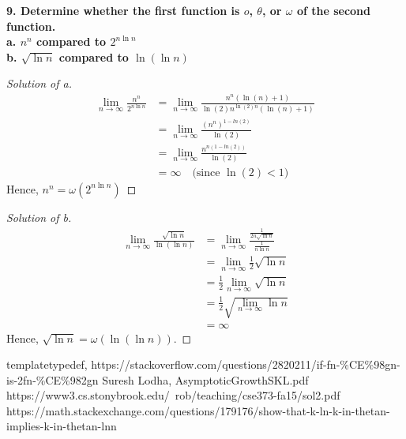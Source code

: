 \documentclass[12pt]{article}
\begin{document}
\noindent \textbf{9. Determine whether the first function is $o$, $\theta$, or $\omega$	of the second function.\\
	a. $n^n$ compared to $2^{n\ln n}$\\
	b. $\sqrt{\ln n}$ compared to $\ln(\ln n)$}
\begin{proof}[Solution of a]
	\begin{align*}
		\lim\limits_{n\to\infty}\frac{n^n}{2^{n\ln n}}&=\lim\limits_{n\to\infty}\frac{n^n(\ln (n)+1)}{\ln(2)n^{\ln(2)n}(\ln(n)+1)}\\
		&=\lim\limits_{n\to\infty}\frac{(n^n)^{1-ln(2)}}{\ln(2)}\\
		&=\lim\limits_{n\to\infty}\frac{n^{n(1-ln(2))}}{\ln(2)}\\
		&=\infty \quad\text{(since $\ln(2)<1$)}
	\end{align*}
	Hence, $n^n = \omega(2^{n\ln n})$
\end{proof}
\begin{proof}[Solution of b]
	\begin{align*}
		\lim\limits_{n\to\infty}\frac{\sqrt{\ln n}}{\ln(\ln n)}&=\lim\limits_{n\to\infty}\frac{\frac{1}{2n\sqrt{\ln n}}}{\frac{1}{n\ln n}}\\
		&=\lim\limits_{n\to\infty}\frac{1}{2}\sqrt{\ln n}\\
		&=\frac{1}{2}\lim\limits_{n\to\infty}\sqrt{\ln n}\\
		&=\frac{1}{2}\sqrt{\lim\limits_{n\to\infty}\ln n}\\
		&=\infty
	\end{align*}
	Hence, $\sqrt{\ln n} =\omega(\ln(\ln n))$.
\end{proof}

\bigskip


\begin{thebibliography}{tptf}
	templatetypedef, https://stackoverflow.com/questions/2820211/if-fn-\%CE\%98gn-is-2fn-\%CE\%982gn
	 Suresh Lodha, AsymptoticGrowthSKL.pdf
	 https://www3.cs.stonybrook.edu/~rob/teaching/cse373-fa15/sol2.pdf
	 https://math.stackexchange.com/questions/179176/show-that-k-ln-k-in-thetan-implies-k-in-thetan-lnn
\end{thebibliography}
\end{document}
